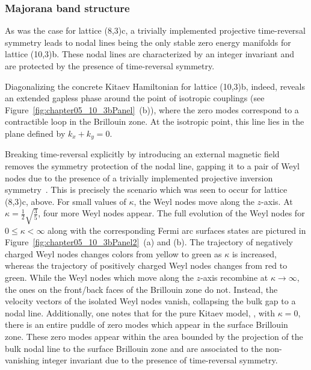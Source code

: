 %
%
\subsubsection{Majorana band structure}
%
%
As was the case for lattice (8,3)c, a trivially implemented projective time-reversal symmetry leads to nodal lines being the only stable zero energy manifolds for lattice (10,3)b.
These nodal lines are characterized by an integer invariant and are protected by the presence of time-reversal symmetry.

Diagonalizing the concrete Kitaev Hamiltonian for lattice (10,3)b, indeed, reveals an extended gapless phase around the point of isotropic couplings (see Figure~\ref{fig:chapter05_10_3bPanel}~(b)), where the zero modes correspond to a contractible loop in the Brillouin zone.
At the isotropic point, this line lies in the plane defined by $k_x + k_y = 0$.

Breaking time-reversal explicitly by introducing an external magnetic field removes the symmetry protection of the nodal line, gapping it to a pair of Weyl nodes due to the presence of a trivially implemented projective inversion symmetry~\cite{HermannsPRL2015}.
This is precisely the scenario which was seen to occur for lattice (8,3)c, above.
For small values of $\kappa$, the Weyl nodes move along the $z$-axis.
At $\kappa = \frac{1}{2} \sqrt{\frac{3}{5}}$, four more Weyl nodes appear.
The full evolution of the Weyl nodes for $0 \leq \kappa < \infty$ along with the corresponding Fermi arc surfaces states are pictured in Figure~\ref{fig:chapter05_10_3bPanel2}~(a) and (b).
The trajectory of negatively charged Weyl nodes changes colors from yellow to green as $\kappa$ is increased, whereas the trajectory of positively charged Weyl nodes changes from red to green.
While the Weyl nodes which move along the $z$-axis recombine at $\kappa \rightarrow \infty$, the ones on the front/back faces of the Brillouin zone do not.
Instead, the velocity vectors of the isolated Weyl nodes vanish, collapsing the bulk gap to a nodal line.
Additionally, one notes that for the pure Kitaev model, \ie, with $\kappa = 0$, there is an entire puddle of zero modes which appear in the surface Brillouin zone.
These zero modes appear within the area bounded by the projection of the bulk nodal line to the surface Brillouin zone and are associated to the non-vanishing integer invariant due to the presence of time-reversal symmetry.


%
%
